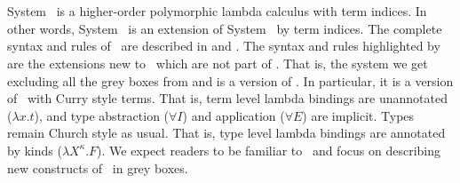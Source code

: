 \section{\Fi}
\label{sec:Fi}
System \Fi\ is a higher-order polymorphic lambda calculus with term indices.
In other words, System \Fi\ is an extension of System \Fw\ by term indices.
The complete syntax and rules of \Fi\ are described in  and .
The syntax and rules highlighted by  are the extensions
new to \Fi\, which are not part of \Fw. That is, the system we get excluding
all the grey boxes from  and  is a version of \Fw.
In particular, it is a version of \Fw\ with Curry style terms. That is,
term level lambda bindings are unannotated ($\lambda x.t$), and
type abstraction ($\forall I$) and application ($\forall E$) are implicit.
Types remain Church style as usual. That is, type level lambda bindings are
annotated by kinds ($\lambda X^\kappa.F$). We expect readers to be familiar
to \Fw\ and focus on describing new constructs of \Fi\ in grey boxes.

